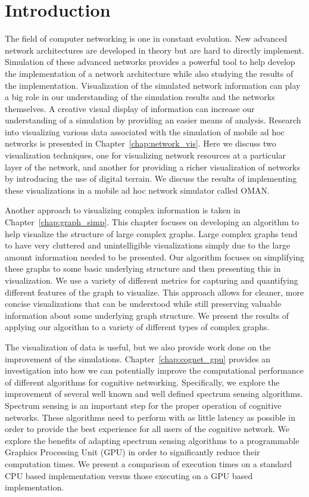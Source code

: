 \chapter{Introduction}

The field of computer networking is one in constant evolution.  New advanced network architectures are developed in theory but are hard to directly implement.  Simulation of these advanced networks provides a powerful tool to help develop the implementation of a network architecture while also studying the results of the implementation.  Visualization of the simulated network information can play a big role in our understanding of the simulation results and the networks themselves.  A creative visual display of information can increase our understanding of a simulation by providing an easier means of analysis.  Research into visualizing various data associated with the simulation of mobile ad hoc networks is presented in Chapter~\ref{chap:network_vis}.  Here we discuss two visualization techniques, one for visualizing network resources at a particular layer of the network, and another for providing a richer visualization of networks by introducing the use of digital terrain.  We discuss the results of implementing these visualizations in a mobile ad hoc network simulator called OMAN.

Another approach to visualizing complex information is taken in Chapter~\ref{chap:graph_simp}.  This chapter focuses on developing an algorithm to help visualize the structure of large complex graphs.  Large complex graphs tend to have very cluttered and unintelligible visualizations simply due to the large amount information needed to be presented.  Our algorithm focuses on simplifying these graphs to some basic underlying structure and then presenting this in visualization.  We use a variety of different metrics for capturing and quantifying different features of the graph to visualize.  This approach allows for cleaner, more concise visualizations that can be understood while still preserving valuable information about some underlying graph structure.  We present the results of applying our algorithm to a variety of different types of complex graphs.

The visualization of data is useful, but we also provide work done on the improvement of the simulations.  Chapter~\ref{chap:cognet_gpu} provides an investigation into how we can potentially improve the computational performance of different algorithms for cognitive networking.  Specifically, we explore the improvement of several well known and well defined spectrum sensing algorithms.  Spectrum sensing is an important step for the proper operation of cognitive networks.  These algorithms need to perform with as little latency as possible in order to provide the best experience for all users of the cognitive network.  We explore the benefits of adapting spectrum sensing algorithms to a programmable Graphics Processing Unit (GPU) in order to significantly reduce their computation times.  We present a comparison of execution times on a standard CPU based implementation versus those executing on a GPU based implementation. 

